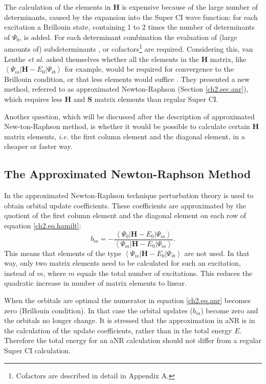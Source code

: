 The calculation of the elements in $\mathbf{H}$ is expensive because of the large number of determinants, caused by the expansion into the Super CI wave function: for each excitation a Brillouin state, containing 1 to 2 times the number of determinants of $\Psi_0$, is added. For each determinant combination the evaluation of (large amounts of) subdeterminants \cite{koos2}, or cofactors\footnote{Cofactors are described in detail in Appendix A.} are required. Considering this, van Lenthe \textit{et al.} asked themselves whether all the elements in the $\mathbf{H}$ matrix, like $\left < \Psi_{ia} | \mathbf{H} - E_0 | \Psi_{ib} \right >$ for example, would be required for convergence to the Brillouin condition, or that less elements would suffice \cite{koos1}. They presented a new method, referred to as approximated Newton-Raphson (Section \ref{ch2.sec.anr}), which requires less $\mathbf{H}$ and $\mathbf{S}$ matrix elements than regular Super CI.

Another question, which will be discussed after the description of approximated New{-}ton-Raphson method, is whether it would be possible to calculate certain $\mathbf{H}$ matrix elements, \textit{i.e.} the first column element and the diagonal element, in a cheaper or faster way. 

\subsection{\label{ch2.sec.anr}The Approximated Newton-Raphson Method}

In the approximated Newton-Raphson technique perturbation theory is used to obtain orbital update coefficients. These coefficients are approximated by the quotient of the first column element and the diagonal element on each row of equation \ref{ch2.eq.hamilt}:
\begin{equation}
b_{ia}= - \frac{\left< \Psi_{0} | \mathbf{H}-E_0 | \Psi_{ia} \right>}{\left< \Psi_{ia} | \mathbf{H}-E_0 | \Psi_{ia} \right>}.
\label{ch2.eq.anr}
\end{equation}
This means that elements of the type $\left< \Psi_{ia} | \mathbf{H}-E_0 | \Psi_{ib} \right>$ are not used. In that way, only two matrix elements need to be calculated for such an excitation, instead of $m$, where $m$ equals the total number of excitations. This reduces the quadratic increase in number of matrix elements to linear.

When the orbitals are optimal the numerator in equation \ref{ch2.eq.anr} becomes zero (Brillouin condition). In that case the orbital updates ($b_{ia}$) become zero and the orbitals no longer change. It is stressed that the approximation in aNR is in the calculation of the update coefficients, rather than in the total energy $E$. Therefore the total energy for an aNR calculation should not differ from a regular Super CI calculation.

